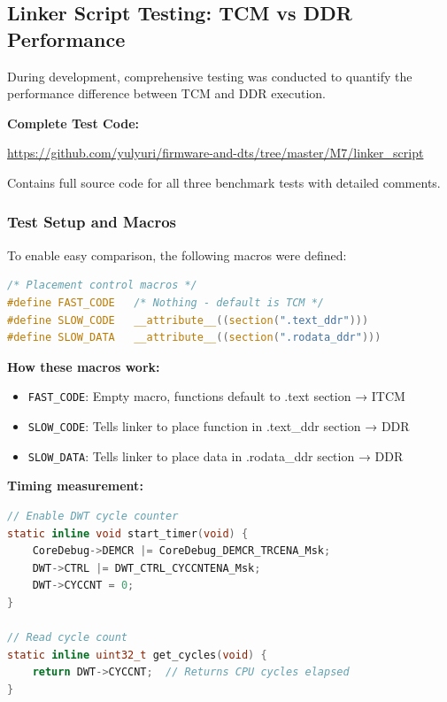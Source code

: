\documentclass[12pt,a4paper]{report}
\begin{document}
\subsection{Linker Script Testing: TCM vs DDR Performance}

During development, comprehensive testing was conducted to quantify the performance difference between TCM and DDR execution.

\begin{gitref}
\textbf{Complete Test Code:}

\url{https://github.com/yulyuri/firmware-and-dts/tree/master/M7/linker_script}

Contains full source code for all three benchmark tests with detailed comments.
\end{gitref}

\subsubsection{Test Setup and Macros}

To enable easy comparison, the following macros were defined:

\begin{lstlisting}[language=c]
/* Placement control macros */
#define FAST_CODE   /* Nothing - default is TCM */
#define SLOW_CODE   __attribute__((section(".text_ddr")))
#define SLOW_DATA   __attribute__((section(".rodata_ddr")))
\end{lstlisting}

\textbf{How these macros work:}
\begin{itemize}
    \item \texttt{FAST\_CODE}: Empty macro, functions default to .text section → ITCM
    \item \texttt{SLOW\_CODE}: Tells linker to place function in .text\_ddr section → DDR
    \item \texttt{SLOW\_DATA}: Tells linker to place data in .rodata\_ddr section → DDR
\end{itemize}

\textbf{Timing measurement:}

\begin{lstlisting}[language=c]
// Enable DWT cycle counter
static inline void start_timer(void) {
    CoreDebug->DEMCR |= CoreDebug_DEMCR_TRCENA_Msk;
    DWT->CTRL |= DWT_CTRL_CYCCNTENA_Msk;
    DWT->CYCCNT = 0;
}

// Read cycle count
static inline uint32_t get_cycles(void) {
    return DWT->CYCCNT;  // Returns CPU cycles elapsed
}
\end{lstlisting}
\end{document}
